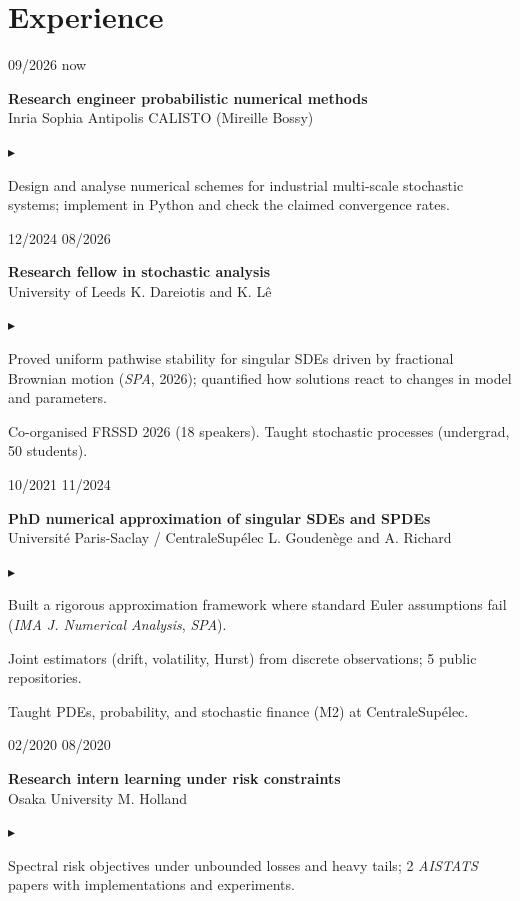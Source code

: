 \documentclass[10pt,a4paper]{article}
\newlength{\datecol}\setlength{\datecol}{0.155\textwidth}
\newlength{\gutter}\setlength{\gutter}{0.85em}
\newlength{\bodycol}
\newcommand{\entry}[3]{%
  \par\vspace{0.50ex}\noindent
  \begin{minipage}[t]{\datecol}
    \vspace{0pt}\raggedright\footnotesize\color{muted}#1
  \end{minipage}%
  \hspace{\gutter}%
  \begin{minipage}[t]{\bodycol}
    \vspace{0pt}\raggedright
    {\headingfont\bfseries\footnotesize #2}\\[0.08ex]
    {\footnotesize\color{accent}#3}
  \end{minipage}%
  \par\vspace{0.10ex}
}
\newenvironment{bullets}
  {\begin{list}{\textcolor{accent}{\scriptsize$\blacktriangleright$}}{%
      \setlength{\leftmargin}{\datecol}
      \addtolength{\leftmargin}{\gutter}
      \addtolength{\leftmargin}{1.15em}
      \setlength{\rightmargin}{0pt}
      \setlength{\labelwidth}{0.85em}
      \setlength{\labelsep}{0.3em}
      \setlength{\itemsep}{0.08ex}
      \setlength{\parsep}{0pt}
      \setlength{\topsep}{0.18ex}
      \setlength{\partopsep}{0pt}
      \footnotesize}}
  {\end{list}}
\begin{document}
\section{Experience}

\entry{09/2026 \textemdash{} now}{Research engineer \textemdash{} probabilistic numerical methods}{Inria Sophia Antipolis \textemdash{} CALISTO (Mireille Bossy)}
\begin{bullets}
  \item Design and analyse numerical schemes for industrial multi-scale stochastic systems; implement in
  Python and check the claimed convergence rates.
\end{bullets}

\entry{12/2024 \textemdash{} 08/2026}{Research fellow in stochastic analysis}{University of Leeds \textemdash{} K. Dareiotis and K. Lê}
\begin{bullets}
  \item Proved uniform pathwise stability for singular SDEs driven by fractional Brownian motion
  (\emph{SPA}, 2026); quantified how solutions react to changes in model and parameters.
  \item Co-organised FRSSD 2026 (18 speakers). Taught stochastic processes (undergrad, 50 students).
\end{bullets}

\entry{10/2021 \textemdash{} 11/2024}{PhD \textemdash{} numerical approximation of singular SDEs and SPDEs}{Université Paris-Saclay / CentraleSupélec \textemdash{} L. Goudenège and A. Richard}
\begin{bullets}
  \item Built a rigorous approximation framework where standard Euler assumptions fail
  (\emph{IMA J. Numerical Analysis}, \emph{SPA}).
  \item Joint estimators (drift, volatility, Hurst) from discrete observations; 5 public repositories.
  \item Taught PDEs, probability, and stochastic finance (M2) at CentraleSupélec.
\end{bullets}

\entry{02/2020 \textemdash{} 08/2020}{Research intern \textemdash{} learning under risk constraints}{Osaka University \textemdash{} M. Holland}
\begin{bullets}
  \item Spectral risk objectives under unbounded losses and heavy tails; 2 \emph{AISTATS} papers with
  implementations and experiments.
\end{bullets}
\end{document}
